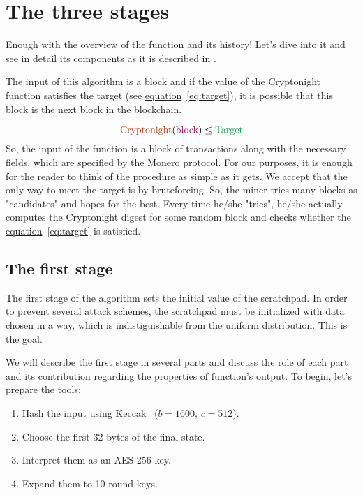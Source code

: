 \section{The three stages}
Enough with the overview of the function and its history! Let's dive into it and see in detail its components as it is described in \cite{cryptonight}.

The input of this algorithm is a block and if the value of the Cryptonight function satisfies the target (see \hyperref[eq:target]{equation}~\ref{eq:target}), it is possible that this block is the next block in the blockchain.

\begin{equation}
  \label{eq:target}
  \color{Bittersweet} \mbox{Cryptonight}
  \color{black} (
  \color{RedViolet} \mbox{block}
  \color{black} )\leq
  \color{ForestGreen} \mbox{Target}
  \color{black}
\end{equation}
So, the input of the function is a block of transactions along with the necessary fields, which are specified by the Monero protocol. For our purposes, it is enough for the reader to think of the procedure as simple as it gets. We accept that the only way to meet the target is by bruteforcing. So, the miner tries many blocks as "candidates" and hopes for the best. Every time he/she "tries", he/she actually computes the Cryptonight digest for some random block and checks whether the \hyperref[eq:target]{equation}~\ref{eq:target} is satisfied.

\subsection{The first stage}
The first stage of the algorithm sets the initial value of the scratchpad. In order to prevent several attack schemes, the scratchpad must be initialized with data chosen in a way, which is indistiguishable from the uniform distribution. This is the goal.

We will describe the first stage in several parts and discuss the role of each part and its contribution regarding the properties of function's output. To begin, let's prepare the tools:
\begin{enumerate}
  \item \label{hashing} Hash the input using Keccak~\cite{keccak} ($b=1600$, $c=512$).
  \item Choose the first 32 bytes of the final state.
  \item Interpret them as an AES-256 key.
  \item Expand them to 10 round keys.
\end{enumerate}

